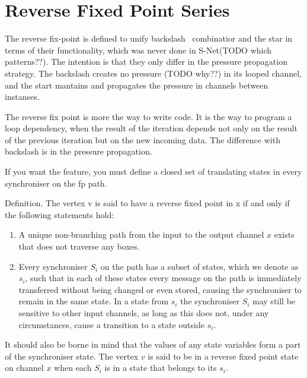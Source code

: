     \section{Reverse Fixed Point Series}
The reverse fix-point is defined to unify backslash \ combinatior and the star in terms of their functionality, which was never done in S-Net(TODO which patterns??). The intention is that they only differ in the pressure propagation strategy. The backslash creates no pressure (TODO why??) in its looped channel, and the start mantains and propagates the pressure in channels between instanses.

%
%
%
%

The reverse fix point is more the way to write code. It is the way to program a loop dependency, when the result of the iteration depends not only on the result of the previous iteration but on the new incoming data. The difference with backslash is in the pressure propagation.

If you want the feature, you must define a closed set of translating states in every synchroniser on the fp path.


Definition. The vertex v is said to have a reverse fixed point in x if and only if the following statements hold:

\begin{enumerate}
\item A unique non-branching path from the input to the output channel $x$ exists that does not traverse any boxes.

\item Every synchroniser $S_i$ on the path has a subset of states, which we denote as $s_i$, such that in each of these states every message on the path is immediately transferred without being changed or even stored, causing the synchroniser to remain in the same state. In a state from $s_i$ the synchroniser $S_i$ may still be sensitive to other input channels, as long as this does not, under any circumstances, cause a transition to a state outside $s_i$.
\end{enumerate}

It should also be borne in mind that the values of any state variables form a part of the synchroniser state.
The vertex $v$ is said to be in a reverse fixed point state on channel $x$ when each $S_i$ is in a state that belongs to its $s_i$.


